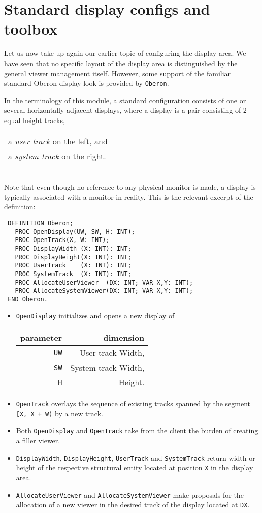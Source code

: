 \section{Standard display configs and toolbox}
\label{sec:stdispconf}
Let us now take up again our earlier topic of configuring the display area. We have seen that
no specific layout of the display area is distinguished by the general viewer management itself.
However, some support of the familiar standard Oberon display look is provided by \verb|Oberon|.

In the terminology of this module, a standard configuration
consists of one or several horizontally adjacent displays,
where a display is a pair consisting of 2 equal height tracks,
\begin{table}[h!]
  \centering
  \begin{tabular}{l}
    a \emph{user track} on the left, and \\
    a \emph{system track} on the right.
  \end{tabular}
\end{table}
\\Note that even though no reference to any physical monitor is made,
a display is typically associated with a monitor in reality.
This is the relevant excerpt of the definition:
\begin{verbatim}
 DEFINITION Oberon;
   PROC OpenDisplay(UW, SW, H: INT);
   PROC OpenTrack(X, W: INT);
   PROC DisplayWidth (X: INT): INT;
   PROC DisplayHeight(X: INT): INT;
   PROC UserTrack    (X: INT): INT;
   PROC SystemTrack  (X: INT): INT;
   PROC AllocateUserViewer  (DX: INT; VAR X,Y: INT);
   PROC AllocateSystemViewer(DX: INT; VAR X,Y: INT);
 END Oberon.
\end{verbatim}
\begin{itemize}
  \item \verb|OpenDisplay| initializes and opens a new display of
    \begin{table}[h!]
      \centering
      \begin{tabular}{r r}
	parameter & dimension \\\hline
        \verb|UW| &   User track Width, \\
        \verb|SW| & System track Width, \\
        \verb|H|  & Height.
      \end{tabular}
    \end{table}
  \item \verb|OpenTrack| overlays the sequence of existing tracks spanned by the segment
    \verb|[X, X + W)| by a new track.
  \item Both \verb|OpenDisplay| and \verb|OpenTrack| take from the client
    the burden of creating a filler viewer.
  \item \verb|DisplayWidth|, \verb|DisplayHeight|, \verb|UserTrack| and \verb|SystemTrack|
    return width or height of the respective structural entity located at position \verb|X|
    in the display area.
  \item \verb|AllocateUserViewer| and \verb|AllocateSystemViewer|
    make proposals for the allocation of a new viewer
    in the desired track of the display located at \verb|DX|.
\end{itemize}
